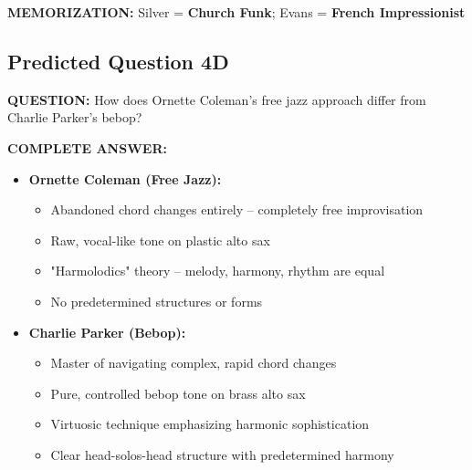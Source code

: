 \documentclass[11pt]{article}
\begin{document}
\textbf{MEMORIZATION:} Silver = \textbf{\textcolor{hardbop}{Church Funk}}; Evans = \textbf{\textcolor{modal}{French Impressionist}}

\subsection*{Predicted Question 4D}

\begin{mdframed}[backgroundcolor=questioncolor!10, linewidth=2pt]
\textbf{\textcolor{questioncolor}{QUESTION:}} How does Ornette Coleman's free jazz approach differ from Charlie Parker's bebop?
\end{mdframed}

\begin{mdframed}[backgroundcolor=answercolor!10, linewidth=2pt]
\textbf{\textcolor{answercolor}{COMPLETE ANSWER:}}

\begin{itemize}[leftmargin=*, nosep]
    \item \textbf{Ornette Coleman (Free Jazz):}
    \begin{itemize}[nosep]
        \item Abandoned chord changes entirely – completely free improvisation
        \item Raw, vocal-like tone on plastic alto sax
        \item "Harmolodics" theory – melody, harmony, rhythm are equal
        \item No predetermined structures or forms
    \end{itemize}
    
    \item \textbf{Charlie Parker (Bebop):}
    \begin{itemize}[nosep]
        \item Master of navigating complex, rapid chord changes
        \item Pure, controlled bebop tone on brass alto sax
        \item Virtuosic technique emphasizing harmonic sophistication
        \item Clear head-solos-head structure with predetermined harmony
    \end{itemize}
\end{itemize}

\vspace{5pt}
\end{mdframed}
\end{document}
